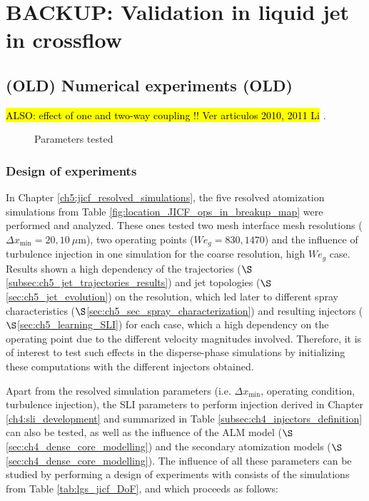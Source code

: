 \chapter{BACKUP: Validation in liquid jet in crossflow}
	\label{ch6:jicf_lgs_simulations}

\section{(OLD) Numerical experiments (OLD)}

\hl{ALSO: effect of one and two-way coupling !! Ver articulos 2010, 2011 Li }.

%
\begin{figure}[h!]	
	\centering
	\caption{Parameters tested}\label{fig:BACKUP_dispersed_phase_sli_parameters}
\end{figure}


\subsection{Design of experiments}

In Chapter \ref{ch5:jicf_resolved_simulations}, the five resolved atomization simulations from Table \ref{fig:location_JICF_ops_in_breakup_map} were performed and analyzed. These ones tested two mesh interface mesh resolutions ($\Delta x_\mathrm{min} = 20, 10~\mu$m), two operating points ($We_g = 830, 1470$) and the influence of turbulence injection in one simulation for the coarse resolution, high $We_g$ case. Results shown a high dependency of the trajectories ($\S$\ref{subsec:ch5_jet_trajectories_results}) and jet topologies ($\S$\ref{sec:ch5_jet_evolution}) on the resolution, which led later to different spray characteristics ($\S$\ref{sec:ch5_sec_spray_characterization}) and resulting injectors ($\S$\ref{sec:ch5_learning_SLI}) for each case, which a high dependency on the operating point due to the different velocity magnitudes involved. Therefore, it is of interest to test such effects in the disperse-phase simulations by initializing these computations with the different injectors obtained.

Apart from the resolved simulation parameters (i.e. $\Delta x_\mathrm{min}$, operating condition, turbulence injection), the SLI parameters to perform injection derived in Chapter \ref{ch4:sli_development} and summarized in Table \ref{subsec:ch4_injectors_definition} can also be tested, as well as the influence of the ALM model ($\S$\ref{sec:ch4_dense_core_modelling}) and the secondary atomization models ($\S$\ref{sec:ch4_dense_core_modelling}). The influence of all these parameters can be studied by performing a design of experiments with consists of the simulations from Table \ref{tab:lgs_jicf_DoF}, and which proceeds as follows: 


